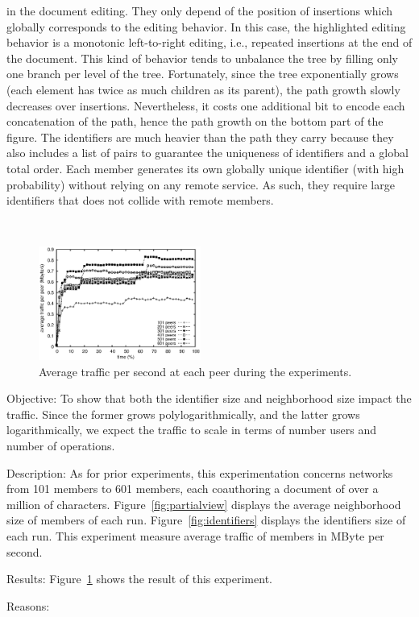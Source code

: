 \begin{asparadesc}
  in the document editing. They only depend of the position of insertions which
  globally corresponds to the editing behavior. In this case, the highlighted
  editing behavior is a monotonic left-to-right editing, i.e., repeated
  insertions at the end of the document. This kind of behavior tends to
  unbalance the tree by filling only one branch per level of the
  tree. Fortunately, since the tree exponentially grows (each element has twice
  as much children as its parent), the path growth slowly decreases over
  insertions. Nevertheless, it costs one additional bit to encode each
  concatenation of the path, hence the path growth on the bottom part of the
  figure. The identifiers are much heavier than the path they carry because they
  also includes a list of pairs to guarantee the uniqueness of identifiers and a
  global total order. Each member generates its own globally unique identifier
  (with high probability) without relying on any remote service. As such, they
  require large identifiers that does not collide with remote members.
\end{asparadesc}

\ \\

\begin{figure}
  \centering
  \includegraphics[width=0.475\textwidth]{./img/traffic.eps}
  \caption{\label{fig:traffic} Average traffic per second at each peer
    during the experiments.}
\end{figure}

\begin{asparadesc}
\item [Objective:] To show that both the identifier size and neighborhood size
  impact the traffic. Since the former grows polylogarithmically, and the latter
  grows logarithmically, we expect the traffic to scale in terms of number users
  and number of operations.
\item [Description:] As for prior experiments, this experimentation concerns
  networks from 101 members to 601 members, each coauthoring a document of over
  a million of characters. Figure~\ref{fig:partialview} displays the average
  neighborhood size of members of each run. Figure~\ref{fig:identifiers}
  displays the identifiers size of each run. This experiment measure average
  traffic of members in MByte per second.
\item [Results:] Figure~\ref{fig:traffic} shows the result of this experiment.
\item [Reasons:]
\end{asparadesc}

